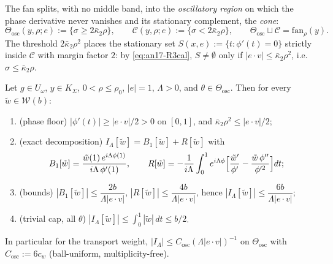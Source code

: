 The fan splits, with no middle band, into the \emph{oscillatory region} on which
the phase derivative never vanishes and its stationary complement, the
\emph{cone}:
\begin{equation}\label{eq:an17-split}
 \Theta_{\mathrm{osc}}(y,\rho;e):=\{\sigma\ge2\bar\kappa_2\rho\},\qquad
 \mathcal C(y,\rho;e):=\{\sigma<2\bar\kappa_2\rho\},\qquad
 \Theta_{\mathrm{osc}}\sqcup\mathcal C=\mathrm{fan}_\rho(y).
\end{equation}
The threshold $2\bar\kappa_2\rho^2$ places the stationary set
$S(x,e):=\{t:\phi'(t)=0\}$ strictly inside $\mathcal C$ with margin factor $2$:
by \eqref{eq:an17-R3cal}, $S\neq\emptyset$ only if
$|e\cdot v|\le\bar\kappa_2\rho^2$, i.e.\ $\sigma\le\bar\kappa_2\rho$.

\begin{lemma}\label{an17:lem-osc}
Let $g\in U_\omega$, $y\in K_\Sigma$, $0<\rho\le\rho_0$, $|e|=1$, $\Lambda>0$,
and $\theta\in\Theta_{\mathrm{osc}}$. Then for every $\tilde w\in\mathcal W(b)$:
\begin{enumerate}
\item[\rm(i)] {\rm(phase floor)} $|\phi'(t)|\ge|e\cdot v|/2>0$ on $[0,1]$, and
 $\bar\kappa_2\rho^2\le|e\cdot v|/2$;
\item[\rm(ii)] {\rm(exact decomposition)}
 $I_\Lambda[\tilde w]=B_1[\tilde w]+R[\tilde w]$ with
 \begin{equation}\label{eq:an17-B1def}
  B_1[\tilde w]=\frac{\tilde w(1)\,e^{i\Lambda\phi(1)}}{i\Lambda\,\phi'(1)},\qquad
  R[\tilde w]=-\frac{1}{i\Lambda}\int_0^1 e^{i\Lambda\phi}
  \Bigl[\frac{\tilde w'}{\phi'}-\frac{\tilde w\,\phi''}{\phi'^2}\Bigr]dt;
 \end{equation}
\item[\rm(iii)] {\rm(bounds)}
 $|B_1[\tilde w]|\le \dfrac{2b}{\Lambda|e\cdot v|}$,
 $|R[\tilde w]|\le \dfrac{4b}{\Lambda|e\cdot v|}$, hence
 $|I_\Lambda[\tilde w]|\le \dfrac{6b}{\Lambda|e\cdot v|}$;
\item[\rm(iv)] {\rm(trivial cap, all $\theta$)}
 $|I_\Lambda[\tilde w]|\le\int_0^1|\tilde w|\,dt\le b/2$.
\end{enumerate}
In particular for the transport weight, $|I_\Lambda|\le C_{\mathrm{osc}}
(\Lambda|e\cdot v|)^{-1}$ on $\Theta_{\mathrm{osc}}$ with
$C_{\mathrm{osc}}:=6c_w$ (ball-uniform, multiplicity-free).
\end{lemma}
